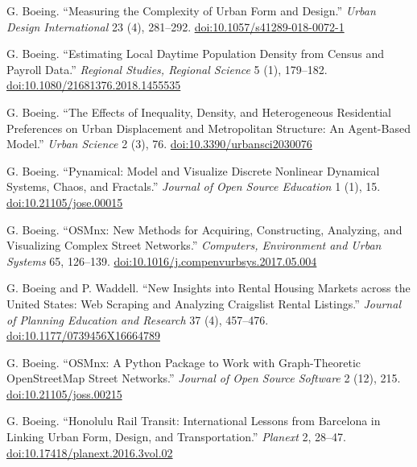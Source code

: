 \documentclass[11pt,a4paper]{report} %
\begin{document}
\begin{tablist}
\item[2018] \tab{}G. Boeing. \enquote{Measuring the Complexity of Urban Form and Design.} \textit{Urban Design International} 23 (4), 281--292. \href{https://doi.org/10.1057/s41289-018-0072-1}{doi:10.1057/s41289-018-0072-1}

\item[2018] \tab{}G. Boeing. \enquote{Estimating Local Daytime Population Density from Census and Payroll Data.} \textit{Regional Studies, Regional Science} 5 (1), 179--182. \href{https://doi.org/10.1080/21681376.2018.1455535}{doi:10.1080/21681376.2018.1455535}

\item[2018] \tab{}G. Boeing. \enquote{The Effects of Inequality, Density, and Heterogeneous Residential Preferences on Urban Displacement and Metropolitan Structure: An Agent-Based Model.} \textit{Urban Science} 2 (3), 76. \href{https://doi.org/10.3390/urbansci2030076}{doi:10.3390/urbansci2030076}

\item[2018] \tab{}G. Boeing. \enquote{Pynamical: Model and Visualize Discrete Nonlinear Dynamical Systems, Chaos, and Fractals.} \textit{Journal of Open Source Education} 1 (1), 15. \href{https://doi.org/10.21105/jose.00015}{doi:10.21105/jose.00015}

\item[2017] \tab{}G. Boeing. \enquote{OSMnx: New Methods for Acquiring, Constructing, Analyzing, and Visualizing Complex Street Networks.} \textit{Computers, Environment and Urban Systems} 65, 126--139. \href{https://doi.org/10.1016/j.compenvurbsys.2017.05.004}{doi:10.1016/j.compenvurbsys.2017.05.004}

\item[2017] \tab{}G. Boeing and P. Waddell. \enquote{New Insights into Rental Housing Markets across the United States: Web Scraping and Analyzing Craigslist Rental Listings.} \textit{Journal of Planning Education and Research} 37 (4), 457--476. \href{https://doi.org/10.1177/0739456X16664789}{doi:10.1177/0739456X16664789}

\item[2017] \tab{}G. Boeing. \enquote{OSMnx: A Python Package to Work with Graph-Theoretic OpenStreetMap Street Networks.} \textit{Journal of Open Source Software} 2 (12), 215. \href{https://doi.org/10.21105/joss.00215}{doi:10.21105/joss.00215}

\item[2016] \tab{}G. Boeing. \enquote{Honolulu Rail Transit: International Lessons from Barcelona in Linking Urban Form, Design, and Transportation.} \textit{Planext} 2, 28--47. \href{https://doi.org/10.17418/planext.2016.3vol.02}{doi:10.17418/planext.2016.3vol.02}


\end{tablist}
\end{document}
